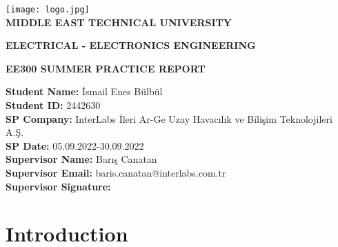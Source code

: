 \documentclass[12pt]{article}
\author{İsmail Enes Bülbül}
\date{October 2022}
\begin{document}
\newpage

\begin{titlepage}
    \begin{center}


        \texttt{[image: logo.jpg]}  \\
        \Huge
        \textbf{MIDDLE EAST TECHNICAL UNIVERSITY}
            
            
        \vspace{1.5cm}
        \LARGE    
        \textbf{ELECTRICAL - ELECTRONICS ENGINEERING}
        \vspace{1.5cm}
            
        \textbf{EE300 SUMMER PRACTICE REPORT}
            
        \vfill
            
            
        \vspace{0.8cm}
            
        
            
        \normalsize
        \begin{flushleft}        
        \textbf{Student Name:} İsmail Enes Bülbül \\
        \textbf{Student ID:} 2442630\\
        \textbf{SP Company:} InterLabs İleri Ar-Ge Uzay Havacılık ve Bilişim Teknolojileri A.Ş.\\
        \textbf{SP Date:} 05.09.2022-30.09.2022\\ 
        \textbf{Supervisor Name:} Barış Canatan\\ 
        \textbf{Supervisor Email:} baris.canatan@interlabs.com.tr\\ 
        \textbf{Supervisor Signature:} \\    
        \end{flushleft}

    \end{center}
\end{titlepage}

    \tableofcontents
    \newpage

    \section{Introduction}
    
\end{document}
